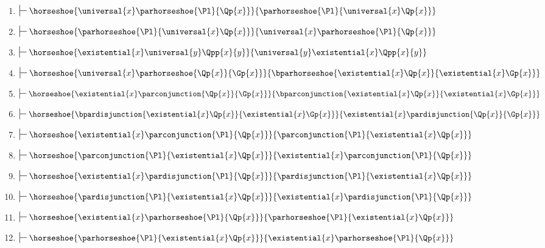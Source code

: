 \begin{multicols}{2}
\begin{enumerate}
\item $\sststile{}{}\horseshoe{\universal{\variable{x}}\parhorseshoe{\Pl}{\Qp{\variable{x}}}}{\parhorseshoe{\Pl}{\universal{\variable{x}}\Qp{\variable{x}}}}$
\item $\sststile{}{}\horseshoe{\parhorseshoe{\Pl}{\universal{\variable{x}}\Qp{\variable{x}}}}{\universal{\variable{x}}\parhorseshoe{\Pl}{\Qp{\variable{x}}}}$

\item $\sststile{}{}\horseshoe{\existential{\variable{x}}\universal{\variable{y}}\Qpp{\variable{x}}{\variable{y}}}{\universal{\variable{y}}\existential{\variable{x}}\Qpp{\variable{x}}{\variable{y}}}$

\item $\sststile{}{}\horseshoe{\universal{\variable{x}}\parhorseshoe{\Qp{\variable{x}}}{\Gp{\variable{x}}}}{\bparhorseshoe{\existential{\variable{x}}\Qp{\variable{x}}}{\existential{\variable{x}}\Gp{\variable{x}}}}$

\item $\sststile{}{}\horseshoe{\existential{\variable{x}}\parconjunction{\Qp{\variable{x}}}{\Gp{\variable{x}}}}{\bparconjunction{\existential{\variable{x}}\Qp{\variable{x}}}{\existential{\variable{x}}\Gp{\variable{x}}}}$

\item $\sststile{}{}\horseshoe{\bpardisjunction{\existential{\variable{x}}\Qp{\variable{x}}}{\existential{\variable{x}}\Gp{\variable{x}}}}{\existential{\variable{x}}\pardisjunction{\Qp{\variable{x}}}{\Gp{\variable{x}}}}$

\item $\sststile{}{}\horseshoe{\existential{\variable{x}}\parconjunction{\Pl}{\Qp{\variable{x}}}}{\parconjunction{\Pl}{\existential{\variable{x}}\Qp{\variable{x}}}}$
\item $\sststile{}{}\horseshoe{\parconjunction{\Pl}{\existential{\variable{x}}\Qp{\variable{x}}}}{\existential{\variable{x}}\parconjunction{\Pl}{\Qp{\variable{x}}}}$

\item $\sststile{}{}\horseshoe{\existential{\variable{x}}\pardisjunction{\Pl}{\Qp{\variable{x}}}}{\pardisjunction{\Pl}{\existential{\variable{x}}\Qp{\variable{x}}}}$
\item $\sststile{}{}\horseshoe{\pardisjunction{\Pl}{\existential{\variable{x}}\Qp{\variable{x}}}}{\existential{\variable{x}}\pardisjunction{\Pl}{\Qp{\variable{x}}}}$

\item $\sststile{}{}\horseshoe{\existential{\variable{x}}\parhorseshoe{\Pl}{\Qp{\variable{x}}}}{\parhorseshoe{\Pl}{\existential{\variable{x}}\Qp{\variable{x}}}}$
\item $\sststile{}{}\horseshoe{\parhorseshoe{\Pl}{\existential{\variable{x}}\Qp{\variable{x}}}}{\existential{\variable{x}}\parhorseshoe{\Pl}{\Qp{\variable{x}}}}$


\end{enumerate}
\end{multicols}
